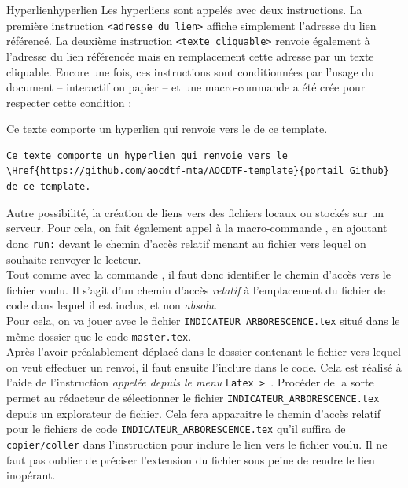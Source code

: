 \documentclass[a4paper, 11pt, twoside, fleqn]{memoir}
\begin{document}
\begin{exemple}{Hyperlien}{hyperlien}
Les hyperliens sont appelés avec deux instructions. La première instruction \texttt{\url{<adresse du lien>}} affiche simplement l'adresse du lien référencé. La deuxième instruction \texttt{\href{<adresse du lien>}{<texte cliquable>}} renvoie également à l'adresse du lien référencée mais en remplacement cette adresse par un texte cliquable. Encore une fois, ces instructions sont conditionnées par l'usage du document -- interactif ou papier -- et une macro-commande \texttt{} a été crée pour respecter cette condition :\\

\begin{minipage}[t]{0.49\linewidth}
Ce texte comporte un hyperlien qui renvoie vers le  de ce template.
\end{minipage}
	\hfill
\begin{minipage}[t]{0.49\linewidth}
\begin{verbatim}
Ce texte comporte un hyperlien qui renvoie vers le \Href{https://github.com/aocdtf-mta/AOCDTF-template}{portail Github} de ce template.
\end{verbatim}
\end{minipage}

Autre possibilité, la création de liens vers des fichiers locaux ou stockés sur un serveur. Pour cela, on fait également appel à la macro-commande \texttt{}, en ajoutant donc \texttt{run:} devant le chemin d'accès relatif menant au fichier vers lequel on souhaite renvoyer le lecteur.\\
Tout comme avec la commande \texttt{}, il faut donc identifier le chemin d'accès vers le fichier voulu. Il s'agit d'un chemin d'accès \emph{relatif} à l'emplacement du fichier de code dans lequel il est inclus, et non \emph{absolu}.\\
Pour cela, on va jouer avec le fichier \texttt{INDICATEUR\_{}ARBORESCENCE.tex} situé dans le même dossier que le code \texttt{master.tex}.\\
Après l'avoir préalablement déplacé dans le dossier contenant le fichier vers lequel on veut effectuer un renvoi, il faut ensuite l'inclure dans le code. Cela est réalisé à l'aide de l'instruction \texttt{} \emph{appelée depuis le menu} \texttt{Latex > }. Procéder de la sorte permet au rédacteur de sélectionner le fichier \texttt{INDICATEUR\_{}ARBORESCENCE.tex} depuis un explorateur de fichier. Cela fera apparaitre le chemin d'accès relatif pour le fichiers de code \texttt{INDICATEUR\_{}ARBORESCENCE.tex} qu'il suffira de \texttt{copier/coller} dans l'instruction \texttt{} pour inclure le lien vers le fichier voulu. Il ne faut pas oublier de préciser l'extension du fichier sous peine de rendre le lien inopérant.\\


\end{exemple}
\end{document}
